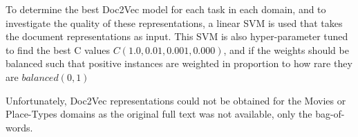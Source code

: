 To determine the best Doc2Vec model for each task in each domain, and to investigate the quality of these representations, a linear SVM is used that takes the document representations as input. This SVM is also hyper-parameter tuned to find the best C values    $ C (1.0, 0.01, 0.001, 0.000)$, and if the  weights should be balanced such that positive instances are weighted in proportion to how rare they are ${balanced} (0, 1)$ 

Unfortunately, Doc2Vec representations could not be obtained for the Movies or Place-Types domains as the original full text was not available, only the bag-of-words.




